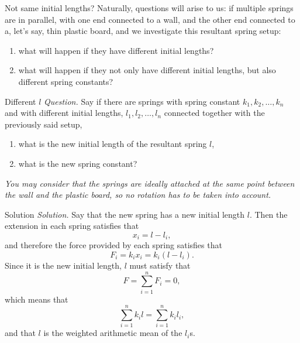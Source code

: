 \documentclass{beamer}
\begin{document}
    \begin{frame}{Not same initial lengths?}
        Naturally, questions will arise to us: if multiple springs are in parallel, with one end connected to a wall, and the other end connected to a, let's say, thin plastic board, and we investigate this resultant spring setup:\pause
        \begin{enumerate}
            \item what will happen if they have \alert{different initial lengths}?\pause
            \item what will happen if they not only have different initial lengths, but also different spring constants?
        \end{enumerate}
    \end{frame}

    \begin{frame}{Different \(l\)}
        \textit{Question.} Say if there are springs with spring constant \(k_1, k_2, \ldots, k_n\) and with different initial lengths, \(l_1, l_2, \ldots, l_n\) connected together with the previously said setup,\pause
        \begin{enumerate}
            \item what is the new initial length of the resultant spring \(l\),\pause
            \item what is the new spring constant?
        \end{enumerate}\pause

        \textit{You may consider that the springs are ideally attached at the same point between the wall and the plastic board, so no rotation has to be taken into account.}
    \end{frame}

    \begin{frame}{Solution}
        \textit{Solution.} Say that the new spring has a new initial length \(l\). Then the extension in each spring satisfies that
        \[
            x_i = l - l_i,
        \]
        and therefore the force provided by each spring satisfies that
        \[
            F_i = k_i x_i = k_i (l - l_i).
        \]
        \pause
        Since it is the new initial length, \(l\) must satisfy that
        \[
            F = \sum_{i = 1}^{n} F_i = 0,
        \]
        which means that
        \[
            \sum_{i = 1}^{n} k_i l = \sum_{i = 1}^{n} k_i l_i,
        \]
        and that \(l\) is the weighted arithmetic mean of the \(l_i\)s.
    \end{frame}
\end{document}
